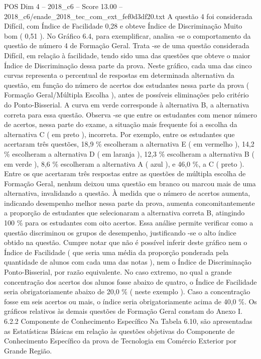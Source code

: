 \begin{textsample}{POS Dim 4 – 2018\_c6 – Score 13.00 – 2018\_c6/enade\_2018\_tec\_com\_ext\_fef0d3df20.txt}
A questão 4 foi considerada Difícil, com Índice de Facilidade 0,28 e obteve Índice de Discriminação Muito bom ( 0,51 ).
No Gráfico 6.4, para exemplificar, analisa -se o comportamento da questão de número 4 de Formação Geral.
Trata -se de uma questão considerada Difícil, em relação à facilidade, tendo sido uma das questões que obteve o maior Índice de Discriminação dessa parte da prova.
Neste gráfico, cada uma das cinco curvas representa o percentual de respostas em determinada alternativa da questão, em função do número de acertos dos estudantes nessa parte da prova ( Formação Geral/Múltipla Escolha ), antes de possíveis eliminações pelo critério do Ponto-Bisserial.
A curva em verde corresponde à alternativa B, a alternativa correta para essa questão.
Observa -se que entre os estudantes com menor número de acertos, nessa parte do exame, a situação mais frequente foi a escolha da alternativa C ( em preto ), incorreta.
Por exemplo, entre os estudantes que acertaram três questões, 18,9 \% escolheram a alternativa E ( em vermelho ), 14,2 \% escolheram a alternativa D ( em laranja ), 12,3 \% escolheram a alternativa B ( em verde ), 8,6 \% escolheram a alternativa A ( azul ), e 46,0 \%, a C ( preto ).
Entre os que acertaram três respostas entre as questões de múltipla escolha de Formação Geral, nenhum deixou uma questão em branco ou marcou mais de uma alternativa, invalidando a questão.
À medida que o número de acertos aumenta, indicando desempenho melhor nessa parte da prova, aumenta concomitantemente a proporção de estudantes que selecionaram a alternativa correta B, atingindo 100 \% para os estudantes com oito acertos.
Essa análise permite verificar como a questão discriminou os grupos de desempenho, justificando -se o alto índice obtido na questão.
Cumpre notar que não é possível inferir deste gráfico nem o Índice de Facilidade ( que seria uma média da proporção ponderada pela quantidade de alunos com cada uma das notas ), nem o Índice de Discriminação Ponto-Bisserial, por razão equivalente.
No caso extremo, no qual a grande concentração dos acertos dos alunos fosse abaixo de quatro, o Índice de Facilidade seria obrigatoriamente abaixo de 20,0 \% ( neste exemplo ).
Caso a concentração fosse em seis acertos ou mais, o índice seria obrigatoriamente acima de 40,0 \%.
Os gráficos relativos às demais questões de Formação Geral constam do Anexo I. 6.2.2 Componente de Conhecimento Específico Na Tabela 6.10, são apresentadas as Estatísticas Básicas em relação às questões objetivas do Componente de Conhecimento Específico da prova de Tecnologia em Comércio Exterior por Grande Região.

\end{textsample}
